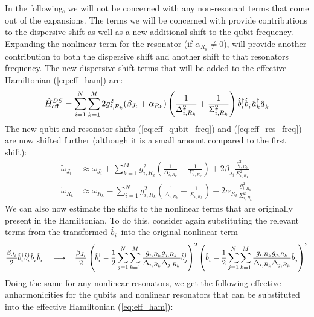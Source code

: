 In the following, we will not be concerned with any non-resonant terms that come out of the expansions. The terms we will be concerned with provide contributions to the dispersive shift as well as a new additional shift to the qubit frequency. Expanding the nonlinear term for the resonator (if $\alpha_{R_k} \neq 0$), will provide another contribution to both the dispersive shift and another shift to that resonators frequency. The new dispersive shift terms that will be added to the effective Hamiltonian (\ref{eq:eff_ham}) are:
\begin{equation}\label{eq:dispersive_shifts}
    \hat{H}_{\text{eff}}^{DS} = \sum_{i=1}^N \sum_{k=1}^M 2g_{i,R_k}^2 (\beta_{J_i} + \alpha_{R_k}) \left( \frac{1}{\Delta_{i,R_k}^2} + \frac{1}{\Sigma_{i,R_k}^2} \right) \opbd_i\opb_i \opad_k\opa_k
\end{equation}
The new qubit and resonator shifts (\ref{eq:eff_qubit_freq}) and (\ref{eq:eff_res_freq}) are now shifted further (although it is a small amount compared to the first shift):
\begin{align}
    \tilde{\omega}_{J_i} &\approx \omega_{J_i} + \sum_{k=1}^M g^2_{i,R_k}\left( \frac{1}{\Delta_{i,R_k}} - \frac{1}{\Sigma_{i,R_k}} \right) + 2\beta_{J_i} \frac{g_{i,R_k}^2}{\Sigma_{i,R_k}^2} \\
    \tilde{\omega}_{R_k} &\approx \omega_{R_k} - \sum_{i=1}^N g^2_{i,R_k}\left( \frac{1}{\Delta_{i,R_k}} + \frac{1}{\Sigma_{i,R_k}} \right) + 2\alpha_{R_k} \frac{g_{i,R_k}^2}{\Sigma_{i,R_k}^2}
\end{align}
We can also now estimate the shifts to the nonlinear terms that are originally present in the Hamiltonian. To do this, consider again substituting the relevant terms from the transformed $\opb_i$ into the original nonlinear term
\begin{equation}
    \frac{\beta_{J_i}}{2}\opbd_i\opbd_i\opb_i\opb_i \quad\longrightarrow\quad \frac{\beta_{J_i}}{2}\left( \opbd_i - \frac{1}{2}\sum_{j=1}^N \sum_{k=1}^M \frac{g_{i,R_k}g_{j,R_k}}{\Delta_{i,R_k}\Delta_{j,R_k}} \opbd_j\right)^2\left(  \opb_i - \frac{1}{2}\sum_{j=1}^N \sum_{k=1}^M \frac{g_{i,R_k}g_{j,R_k}}{\Delta_{i,R_k}\Delta_{j,R_k}} \opb_j \right)^2
\end{equation} 
Doing the same for any nonlinear resonators, we get the following effective anharmonicities for the qubits and nonlinear resonators that can be substituted into the effective Hamiltonian (\ref{eq:eff_ham}):
